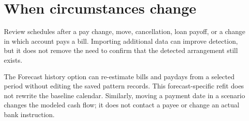 \section{When circumstances change}
Review schedules after a pay change, move, cancellation, loan payoff, or a change in which account pays a bill. Importing additional data can improve detection, but it does not remove the need to confirm that the detected arrangement still exists.

The Forecast history option can re-estimate bills and paydays from a selected period without editing the saved pattern records. This forecast-specific refit does not rewrite the baseline calendar. Similarly, moving a payment date in a scenario changes the modeled cash flow; it does not contact a payee or change an actual bank instruction.


